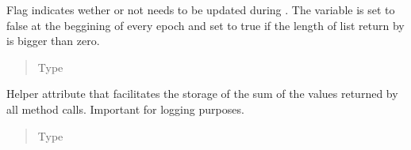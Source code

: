 \documentclass[letterpaper,10pt,english]{sphinxmanual}
\begin{document}
\begin{fulllineitems}
\begin{fulllineitems}
\label{\detokenize{app.domain:app.domain.cluster_groups.Cluster._membership_changed}}
Flag indicates wether or not {\hyperref[\detokenize{app.domain:app.domain.cluster_groups.Cluster._members_view}]{}} needs
to be updated during {\hyperref[\detokenize{app.domain:app.domain.cluster_groups.Cluster.membership_maintenance}]{}}. The
variable is set to false at the beggining of every epoch and set
to true if the length of  list return by
{\hyperref[\detokenize{app.domain:app.domain.cluster_groups.Cluster.nodes_execute}]{}} is bigger than zero.
\begin{quote}\begin{description}
\item[{Type}] \leavevmode
{}

\end{description}\end{quote}

\end{fulllineitems}


\begin{fulllineitems}
\label{\detokenize{app.domain:app.domain.cluster_groups.Cluster._recovery_epoch_sum}}
Helper attribute that facilitates the storage of the sum of the
values returned by all
method calls. Important for logging purposes.
\begin{quote}\begin{description}
\item[{Type}] \leavevmode
{}

\end{description}\end{quote}

\end{fulllineitems}



\end{fulllineitems}
\end{document}
